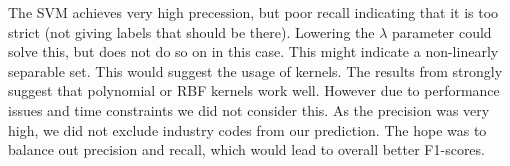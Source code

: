 \documentclass{article}
\begin{document}
The SVM achieves very high precession, but poor recall indicating that it is too strict (not giving labels that should be there). Lowering the $\lambda$ parameter could solve this, but does not do so on in this case. This might indicate a non-linearly separable set. This would suggest the usage of kernels. The results from \cite{joachims_text_1998} strongly suggest that polynomial or RBF kernels work well. However due to performance issues and time constraints we did not consider this. As the precision was very high, we did not exclude industry codes from our prediction. The hope was to balance out precision and recall, which would lead to overall better F1-scores.

\vspace{-2mm}
\tiny{\printbibliography}
\end{document}
